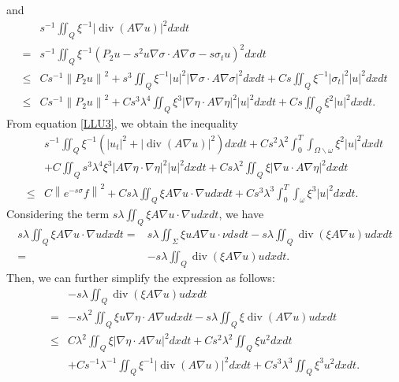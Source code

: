 \documentclass[9pt,reqno]{amsart}
\theoremstyle{plain}
\numberwithin{equation}{section}
\numberwithin{theorem}{section}
\def\Om{\Omega}
\DeclareMathOperator*{\Div}{\mathrm{div}}
\def\Om{\Omega}
\begin{document}
	and
	\begin{equation*}
		\begin{split}
			&s^{-1}   \iint_Q \xi^{-1}\left|\Div(A\nabla u)\right|^2dx  d t\\
			=& s^{-1}   \iint_Q \xi^{-1}(P_2 u -s^2 u \nabla \sigma \cdot A \nabla \sigma - s \sigma_t u)^2dx  d t\\
			\leq& C s^{-1} \left\|P_2 u\right\|^2+s^3   \iint_Q \xi^{-1}|u|^2\left|\nabla \sigma \cdot A \nabla \sigma\right|^2dx  d t +C s   \iint_Q \xi^{-1}\left|\sigma_t\right|^2|u|^2dx  d t \\
			\leq& C s^{-1} \left\|P_2 u\right\|^2+C s^3 \lambda^4   \iint_Q \xi^3|\nabla \eta \cdot A \nabla \eta|^2|u|^2dx  d t +C s   \iint_Q \xi^{2}|u|^2dx  d t.
		\end{split}
	\end{equation*}
	From equation \eqref{LLU3}, we obtain the inequality
	\begin{equation}\label{LLU4}
		\begin{split}
			&s^{-1}\iint_{Q} \xi^{-1} (|u_t |^2 + \left|\Div(A\nabla u)\right|^2) dx dt +C s^2 \lambda^2 \int_0^T \int_{\Om\backslash \omega} \xi^{2}|u|^2dx  d t\\
			&+C\iint_Q s^3 \lambda^4 \xi^3\left|A \nabla \eta \cdot \nabla \eta \right|^2|u|^2 dx dt  + C s  \lambda^2 \iint_Q\xi|\nabla u \cdot A \nabla \eta|^2 dx  d t\\
			\leq& C\left\|e^{-s \sigma} f\right\|^2
			+Cs \lambda \iint_Q \xi A \nabla u \cdot \nabla udx  d t+Cs^3 \lambda^3 \int_0^T \int_{\omega} \xi^3|u|^2dx  d t.
		\end{split}
	\end{equation}
	Considering the term $s \lambda \iint_Q \xi A \nabla u \cdot \nabla udx d t$, we have
	\begin{equation*}
		\begin{split}
			s \lambda \iint_Q \xi A \nabla u \cdot \nabla udx  d t=& s \lambda \iint_\Sigma \xi u A \nabla u \cdot \nu d s d t - s \lambda \iint_Q \Div(\xi A\nabla u) udx  d t\\
			=&- s \lambda \iint_Q \Div(\xi A\nabla u) udx  d t.
		\end{split}
	\end{equation*}
	Then, we can further simplify the expression as follows:
	\begin{equation*}
		\begin{split}
			&- s \lambda \iint_Q \Div(\xi A\nabla u) udx  d t\\
			=&- s \lambda^2 \iint_Q \xi u\nabla \eta \cdot A\nabla u dx  d t - s \lambda \iint_Q \xi\Div( A\nabla u) udx  d t\\
			\le& C \lambda^2 \iint_Q \xi \left|  \nabla \eta \cdot A\nabla u \right| ^2dx  d t + Cs^2 \lambda^2 \iint_Q \xi u^2dx  d t\\
			&+C s^{-1} \lambda^{-1} \iint_Q \xi^{-1} \left| \Div( A\nabla u)\right| ^2dx  d t + Cs^3 \lambda^3 \iint_Q \xi^3 u^2dx  d t.
		\end{split}
	\end{equation*}
\end{document}
